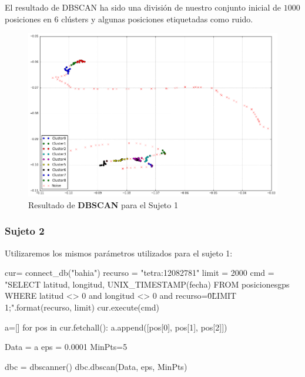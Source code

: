 \documentclass[a4paper, 12pt, spanish]{article}
\begin{document}
El resultado de DBSCAN ha sido una divisi\'on de nuestro conjunto inicial de $1000$ posiciones en 6 cl\'usters y algunas posiciones etiquetadas como ruido.


\begin{figure}[H]
	\includegraphics[width=15cm]{../comparativa/dbscanSujeto1.png}
	\caption{Resultado de \textbf{DBSCAN} para el Sujeto 1}
\end{figure}


\subsubsection{Sujeto 2}

Utilizaremos los mismos par\'ametros utilizados para el sujeto 1:\\

\begin{python}
cur= connect_db("bahia")
recurso = "tetra:12082781"
limit = 2000
cmd = "SELECT latitud, longitud, UNIX_TIMESTAMP(fecha) 
	FROM posicionesgps 
	WHERE latitud <> 0 and longitud <> 0 and recurso=\"{0}\" 
	LIMIT {1};".format(recurso, limit)
cur.execute(cmd)

a=[]
for pos in cur.fetchall():
    a.append([pos[0], pos[1], pos[2]])

Data = a
eps = 0.0001
MinPts=5

dbc = dbscanner()
dbc.dbscan(Data, eps, MinPts)
\end{python}
\end{document}
